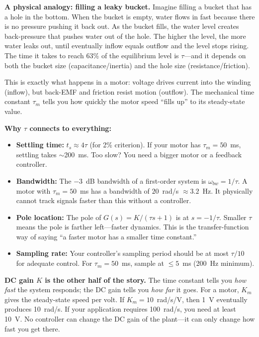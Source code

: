 \begin{mdframed}[linewidth=1pt, innertopmargin=10pt, innerbottommargin=10pt]
\textbf{A physical analogy: filling a leaky bucket.} Imagine filling a bucket that has a hole in the bottom. When the bucket is empty, water flows in fast because there is no pressure pushing it back out. As the bucket fills, the water level creates back-pressure that pushes water out of the hole. The higher the level, the more water leaks out, until eventually inflow equals outflow and the level stops rising. The time it takes to reach 63\% of the equilibrium level is $\tau$---and it depends on both the bucket size (capacitance/inertia) and the hole size (resistance/friction).

This is exactly what happens in a motor: voltage drives current into the winding (inflow), but back-EMF and friction resist motion (outflow). The mechanical time constant $\tau_m$ tells you how quickly the motor speed ``fills up'' to its steady-state value.

\textbf{Why $\tau$ connects to everything:}
\begin{itemize}[nosep]
    \item \textbf{Settling time:} $t_s \approx 4\tau$ (for 2\% criterion). If your motor has $\tau_m = 50$~ms, settling takes $\sim$200~ms. Too slow? You need a bigger motor or a feedback controller.
    \item \textbf{Bandwidth:} The $-3$~dB bandwidth of a first-order system is $\omega_{bw} = 1/\tau$. A motor with $\tau_m = 50$~ms has a bandwidth of $20$~rad/s $\approx 3.2$~Hz. It physically cannot track signals faster than this without a controller.
    \item \textbf{Pole location:} The pole of $G(s) = K/(\tau s + 1)$ is at $s = -1/\tau$. Smaller $\tau$ means the pole is farther left---faster dynamics. This is the transfer-function way of saying ``a faster motor has a smaller time constant.''
    \item \textbf{Sampling rate:} Your controller's sampling period should be at most $\tau/10$ for adequate control. For $\tau_m = 50$~ms, sample at $\leq 5$~ms (200~Hz minimum).
\end{itemize}

\textbf{DC gain $K$ is the other half of the story.} The time constant tells you \textit{how fast} the system responds; the DC gain tells you \textit{how far} it goes. For a motor, $K_m$ gives the steady-state speed per volt. If $K_m = 10$~rad/s/V, then 1~V eventually produces 10~rad/s. If your application requires 100~rad/s, you need at least 10~V. No controller can change the DC gain of the plant---it can only change how fast you get there.


\end{mdframed}
